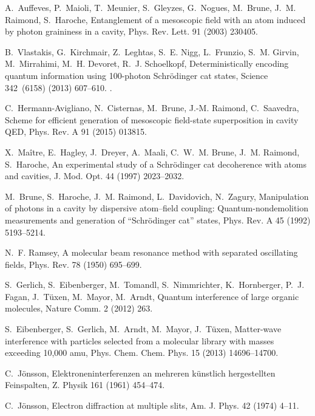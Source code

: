 \documentclass[3p,sort&compress]{elsarticle}
\begin{document}
\begin{thebibliography}{100}
A.~Auffeves, P.~Maioli, T.~Meunier, S.~Gleyzes, G.~Nogues, M.~Brune, J.~M.
  Raimond, S.~Haroche, Entanglement of a mesoscopic field with an atom induced
  by photon graininess in a cavity, Phys. Rev. Lett. 91 (2003) 230405.

B.~Vlastakis, G.~Kirchmair, Z.~Leghtas, S.~E. Nigg, L.~Frunzio, S.~M. Girvin,
  M.~Mirrahimi, M.~H. Devoret, R.~J. Schoelkopf, Deterministically encoding
  quantum information using 100-photon {S}chr{\"o}dinger cat states, Science
  342~(6158) (2013) 607--610.
\newblock \href {http://dx.doi.org/10.1126/science.1243289}
  {}.

C.~Hermann-Avigliano, N.~Cisternas, M.~Brune, J.-M. Raimond, C.~Saavedra,
  Scheme for efficient generation of mesoscopic field-state superposition in
  cavity {QED}, Phys. Rev. A 91 (2015) 013815.

X.~Ma{\^i}tre, E.~Hagley, J.~Dreyer, A.~Maali, C.~W.~M. Brune, J.~M. Raimond,
  S.~Haroche, An experimental study of a {S}chr{\"o}dinger cat decoherence with
  atoms and cavities, J. Mod. Opt. 44 (1997) 2023--2032.

M.~Brune, S.~Haroche, J.~M. Raimond, L.~Davidovich, N.~Zagury, Manipulation of
  photons in a cavity by dispersive atom--field coupling: Quantum-nondemolition
  measurements and generation of {``}{S}chr{\"o}dinger cat{''} states, Phys.
  Rev. A 45 (1992) 5193--5214.

N.~F. Ramsey, A molecular beam resonance method with separated oscillating
  fields, Phys. Rev. 78 (1950) 695--699.

S.~Gerlich, S.~Eibenberger, M.~Tomandl, S.~Nimmrichter, K.~Hornberger, P.~J.
  Fagan, J.~T{\"u}xen, M.~Mayor, M.~Arndt, Quantum interference of large
  organic molecules, Nature Comm. 2 (2012) 263.

S.~Eibenberger, S.~Gerlich, M.~Arndt, M.~Mayor, J.~T{\"u}xen, Matter-wave
  interference with particles selected from a molecular library with masses
  exceeding 10,000 amu, Phys. Chem. Chem. Phys. 15 (2013) 14696--14700.

C.~J{\"o}nsson, Elektroneninterferenzen an mehreren k{\"u}nstlich hergestellten
  {F}einspalten, Z. Physik 161 (1961) 454--474.

C.~J{\"o}nsson, Electron diffraction at multiple slits, Am. J. Phys. 42 (1974)
  4--11.


\end{thebibliography}
\end{document}
